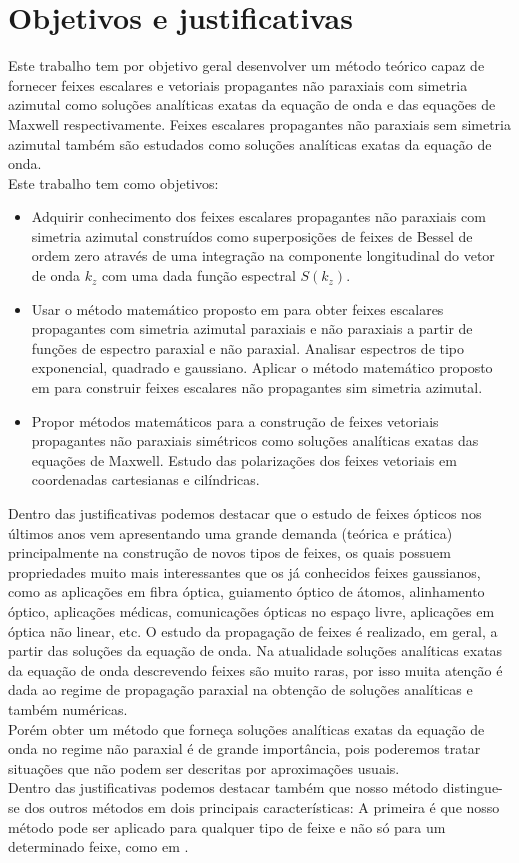 \section{Objetivos e justificativas}
Este trabalho tem por objetivo geral desenvolver um método teórico capaz de fornecer feixes escalares e vetoriais propagantes não paraxiais com simetria azimutal como soluções analíticas exatas da equação de onda e das equações de Maxwell respectivamente. Feixes escalares propagantes não paraxiais sem simetria azimutal também são estudados como soluções analíticas exatas da equação de onda.\\
Este trabalho tem como objetivos:
\begin{itemize}
\item Adquirir conhecimento dos feixes escalares propagantes não paraxiais com simetria azimutal construídos como superposições de feixes de Bessel de ordem zero através de uma integração na componente longitudinal do vetor de onda $k_z$ com uma dada função espectral $S(k_z)$.
\item Usar o método matemático proposto em  para obter feixes escalares propagantes com simetria azimutal paraxiais e não paraxiais a partir de funções de espectro paraxial e não paraxial. Analisar espectros de tipo exponencial, quadrado e gaussiano. Aplicar o método matemático proposto em  para construir feixes escalares não propagantes sim simetria azimutal. 
\item Propor métodos matemáticos para a construção de feixes vetoriais propagantes não paraxiais simétricos como soluções analíticas exatas das equações de Maxwell. Estudo das polarizações dos feixes vetoriais em coordenadas cartesianas e cilíndricas.
\end{itemize}  
Dentro das justificativas podemos destacar que o estudo de feixes ópticos nos últimos anos vem apresentando uma grande demanda (teórica e prática) principalmente na construção de novos tipos de feixes, os quais possuem propriedades muito mais interessantes que os já conhecidos feixes gaussianos, como as aplicações em fibra óptica, guiamento óptico de átomos, alinhamento óptico, aplicações médicas, comunicações ópticas no espaço livre, aplicações em óptica não linear, etc. O estudo da propagação de feixes é realizado, em geral, a partir das soluções da equação de onda. Na atualidade soluções analíticas exatas da equação de onda descrevendo feixes são muito raras, por isso muita atenção é dada ao regime de propagação paraxial na obtenção de soluções analíticas e também numéricas.\\
Porém obter um método que forneça soluções analíticas exatas da equação de onda no regime não paraxial é de grande importância, pois poderemos tratar situações que não podem ser descritas por aproximações usuais.\\
Dentro das justificativas podemos destacar também que nosso método \cite{Stratton:02} distingue-se dos outros métodos em dois principais características: A primeira é que nosso método pode ser aplicado para qualquer tipo de feixe e não s\'o para um determinado feixe, como em \cite{Stratton:02, Jackson:03,Figueroa:05,Sochacki:1}.
 
